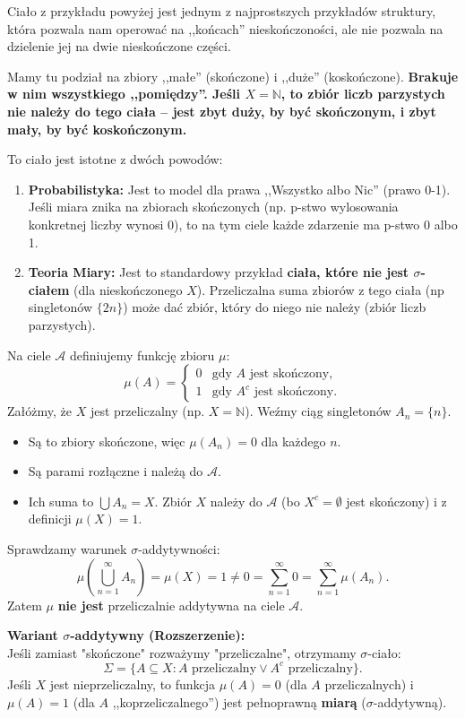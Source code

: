 \begin{remark}
    Ciało z przykładu powyżej jest jednym z najprostszych przykładów struktury, która pozwala nam operować na ,,końcach'' nieskończoności, ale nie pozwala na dzielenie jej na dwie nieskończone części.
    
    Mamy tu podział na zbiory ,,małe'' (skończone) i ,,duże'' (koskończone). \textbf{Brakuje w nim wszystkiego ,,pomiędzy''. Jeśli $X=\mathbb{N}$, to zbiór liczb parzystych nie należy do tego ciała – jest zbyt duży, by być skończonym, i zbyt mały, by być koskończonym.}
    
    To ciało jest istotne z dwóch powodów:
    \begin{enumerate}
        \item \textbf{Probabilistyka:} Jest to model dla prawa ,,Wszystko albo Nic'' (prawo 0-1). Jeśli miara znika na zbiorach skończonych (np. p-stwo wylosowania konkretnej liczby wynosi 0), to na tym ciele każde zdarzenie ma p-stwo 0 albo 1.
        \item \textbf{Teoria Miary:} Jest to standardowy przykład \textbf{ciała, które nie jest $\sigma$-ciałem} (dla nieskończonego $X$). Przeliczalna suma zbiorów z tego ciała (np singletonów $\{2n\}$) może dać zbiór, który do niego nie należy (zbiór liczb parzystych).
    \end{enumerate}
\end{remark}

\begin{remark}	
 Na ciele $\mathcal{A}$ definiujemy funkcję zbioru $\mu$:
    \[
        \mu(A) = \begin{cases} 
            0 & \text{gdy } A \text{ jest skończony}, \\
            1 & \text{gdy } A^c \text{ jest skończony}.
        \end{cases}
\]
    Załóżmy, że $X$ jest przeliczalny (np. $X = \mathbb{N}$).
    Weźmy ciąg singletonów $A_n = \{n\}$.
    \begin{itemize}
        \item Są to zbiory skończone, więc $\mu(A_n) = 0$ dla każdego $n$.
        \item Są parami rozłączne i należą do $\mathcal{A}$.
        \item Ich suma to $\bigcup A_n = X$. Zbiór $X$ należy do $\mathcal{A}$ (bo $X^c = \emptyset$ jest skończony) i z definicji $\mu(X) = 1$.
    \end{itemize}
    Sprawdzamy warunek $\sigma$-addytywności:
    \[
        \mu\left( \bigcup_{n=1}^\infty A_n \right) = \mu(X) = 1 \neq 0 = \sum_{n=1}^\infty 0 = \sum_{n=1}^\infty \mu(A_n).
   \]
    Zatem $\mu$ \textbf{nie jest} przeliczalnie addytywna na ciele $\mathcal{A}$.

    \textbf{Wariant $\sigma$-addytywny (Rozszerzenie):} \\
    Jeśli zamiast "skończone" rozważymy "przeliczalne", otrzymamy $\sigma$-ciało:
    \[
        \Sigma = \{ A \subseteq X : A \text{ przeliczalny} \lor A^c \text{ przeliczalny} \}.
    \]
    Jeśli $X$ jest nieprzeliczalny, to funkcja $\mu(A)=0$ (dla $A$ przeliczalnych) i $\mu(A)=1$ (dla $A$ ,,koprzeliczalnego'') jest pełnoprawną \textbf{miarą} ($\sigma$-addytywną).
\end{remark} 
